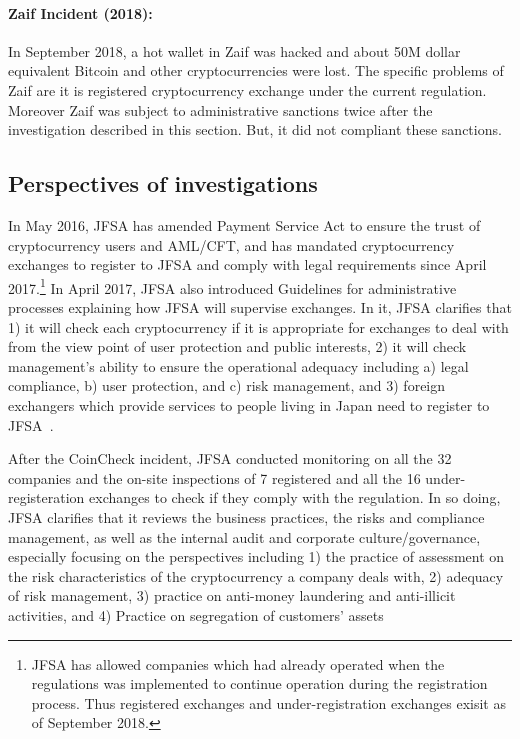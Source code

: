 \paragraph{Zaif Incident (2018):}
In September 2018, a hot wallet in Zaif was hacked and about 50M dollar equivalent Bitcoin and other cryptocurrencies were lost.
The specific problems of Zaif are it is registered cryptocurrency exchange under the current regulation. Moreover Zaif was
subject to administrative sanctions twice after the investigation described in this section. But, it did not
compliant these sanctions.

\subsection{Perspectives of investigations}
In May 2016, JFSA has amended Payment Service Act to ensure the trust of cryptocurrency users and AML/CFT, and has mandated cryptocurrency exchanges to register to JFSA and comply with legal requirements since April 2017.\footnote{JFSA has allowed companies which had already operated when the regulations was implemented to continue operation during the registration process. Thus registered exchanges and under-registration exchanges exisit as of September 2018.} In April 2017, JFSA also introduced Guidelines for administrative processes explaining how JFSA will supervise exchanges. In it, JFSA clarifies that 1) it will check each cryptocurrency if it is appropriate for exchanges to deal with from the view point of user protection and public interests, 2) it will check management's ability to ensure the operational adequacy including a) legal compliance, b) user protection, and c) risk management, and 3) foreign exchangers which provide services to people living in Japan need to register to JFSA~\cite{FSAGUIDELINE}.

After the CoinCheck incident, JFSA conducted monitoring on all the 32 companies and the on-site inspections of 7 registered and all the 16 under-registeration exchanges to check if they comply with the regulation. In so doing, JFSA clarifies that it reviews the business practices, the risks and compliance management, as well as the internal audit and corporate culture/governance, especially focusing on the perspectives including 1) the practice of assessment on the risk characteristics of the cryptocurrency a company deals with, 2) adequacy of risk management, 3) practice on anti-money laundering and anti-illicit activities, and 4) Practice on segregation of customers' assets

